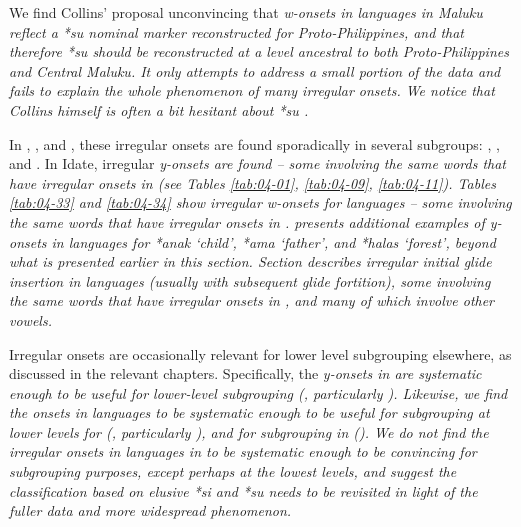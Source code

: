 We find Collins’ proposal unconvincing that \it{w}-onsets in
 languages in Maluku reflect a *su nominal marker
reconstructed for Proto-Philippines, and that therefore *su should be reconstructed at a level ancestral
to both Proto-Philippines and Central Maluku.
It only attempts to address a small portion of the data
and fails to explain the whole phenomenon of many irregular onsets.
We notice that Collins himself is often a bit hesitant about *su \citep[130--131]{Collins1983}.

In , , and , these irregular
onsets are found sporadically in several subgroups: , , and .
In  Idate, irregular \it{y}-onsets are found -- some
involving the same words that have irregular onsets in 
(see Tables \ref{tab:04-01}, \ref{tab:04-09}, \ref{tab:04-11}).
Tables \ref{tab:04-33} and \ref{tab:04-34} show irregular \it{w}-onsets for 
languages  -- some involving the same words
that have irregular onsets in .
 presents additional examples of \it{y}-onsets in
 languages for *anak ‘child’,
*ama ‘father’, and *halas ‘forest’, beyond what is presented
earlier in this section.
Section  describes irregular initial glide insertion
in  languages (usually with subsequent glide fortition),
some involving the same words that have irregular onsets in ,
and many of which involve other vowels.

Irregular onsets are occasionally relevant for lower level subgrouping
elsewhere, as discussed in the relevant chapters.
Specifically, the \it{y}-onsets in 
are systematic enough to be useful for lower-level subgrouping (, particularly ).
Likewise, we find the onsets in  languages to be systematic
enough to be useful for subgrouping at lower levels for 
(, particularly ), and for subgrouping in  ().
We do not find the irregular onsets in  languages
in  to be systematic enough to be convincing
for subgrouping purposes, except perhaps at the lowest levels,
and suggest the classification based on elusive *si
and *su \citep[128]{Collins1983} needs to be revisited in light
of the fuller data
and more widespread phenomenon.

